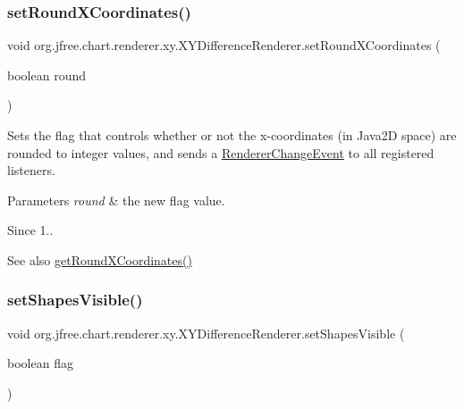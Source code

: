 \subsubsection{\texorpdfstring{set\+Round\+X\+Coordinates()}{setRoundXCoordinates()}}
{\footnotesize\ttfamily void org.\+jfree.\+chart.\+renderer.\+xy.\+X\+Y\+Difference\+Renderer.\+set\+Round\+X\+Coordinates (\begin{DoxyParamCaption}\item[{boolean}]{round }\end{DoxyParamCaption})}

Sets the flag that controls whether or not the x-\/coordinates (in Java2D space) are rounded to integer values, and sends a \mbox{\hyperlink{}{Renderer\+Change\+Event}} to all registered listeners.


\begin{DoxyParams}{Parameters}
{\em round} & the new flag value.\\
\hline
\end{DoxyParams}
\begin{DoxySince}{Since}
1..
\end{DoxySince}
\begin{DoxySeeAlso}{See also}
\mbox{\hyperlink{classorg_1_1jfree_1_1chart_1_1renderer_1_1xy_1_1_x_y_difference_renderer_aa98e8a1cd320c4a9f90c1f1d2727c2e6}{get\+Round\+X\+Coordinates()}} 
\end{DoxySeeAlso}
\mbox{\label{classorg_1_1jfree_1_1chart_1_1renderer_1_1xy_1_1_x_y_difference_renderer_a19d0ac0748a1b8eab687aac2f6a352c1}} 
\subsubsection{\texorpdfstring{set\+Shapes\+Visible()}{setShapesVisible()}}
{\footnotesize\ttfamily void org.\+jfree.\+chart.\+renderer.\+xy.\+X\+Y\+Difference\+Renderer.\+set\+Shapes\+Visible (\begin{DoxyParamCaption}\item[{boolean}]{flag }\end{DoxyParamCaption})}


